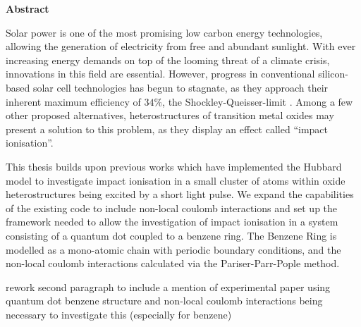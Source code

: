 \def\changemargin#1#2{\list{}{\rightmargin#2\leftmargin#1}\item[]}
\let\endchangemargin=\endlist 

{\small\begin{center}%
\bfseries{Abstract}
\end{center}}

\begin{changemargin}{1cm}{1cm}

Solar power is one of the most promising low carbon energy technologies, allowing the generation of electricity from free and abundant sunlight. With ever increasing energy demands on top of the looming threat of a climate crisis, innovations in this field are essential. However, progress in conventional silicon-based solar cell technologies has begun to stagnate, as they approach their inherent maximum efficiency of $34\%$, the Shockley-Queisser-limit \cite{shockley_queisser}. Among a few other proposed alternatives, heterostructures of transition metal oxides may present a solution to this problem, as they display an effect called ``impact ionisation''.

\smallskip

This thesis builds upon previous works \cite{innerberger, worm_bachelor, prauhart, worm_project} which have implemented the Hubbard model to investigate impact ionisation in a small cluster of atoms within oxide heterostructures being excited by a short light pulse. We expand the capabilities of the existing code to include non-local coulomb interactions and set up the framework needed to allow the investigation of impact ionisation in a system consisting of a quantum dot coupled to a benzene ring. The Benzene Ring is modelled as a mono-atomic chain with periodic boundary conditions, and the non-local coulomb interactions calculated via the Pariser-Parr-Pople method.

\smallskip
{\color{blue} rework second paragraph to include a mention of experimental paper using quantum dot benzene structure and non-local coulomb interactions being necessary to investigate this (especially for benzene)}
\end{changemargin}